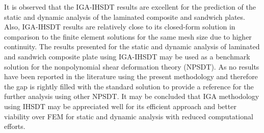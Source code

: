 \documentclass[3p,preprint,12pt]{elsarticle}
\begin{document}
It is observed that the IGA-IHSDT results are excellent for the prediction of the static and dynamic analysis of the laminated composite and sandwich plates. Also, IGA-IHSDT results are relatively close to its closed-form solution in comparison to the finite element solutions for the same mesh size due to higher continuity. The results presented for the static and dynamic analysis of laminated and sandwich composite plate using IGA-IHSDT may be used as a benchmark solution for the nonpolynomial shear deformation theory (NPSDT). {\color{purple}As no results have been reported in the literature using the present methodology and therefore the gap is rightly filled with the standard solution to provide a reference for the further analysis using other NPSDT.} It may be concluded that IGA methodology using IHSDT may be appreciated well for its efficient approach and better viability over FEM for static and dynamic analysis with reduced computational efforts.


\end{document}
